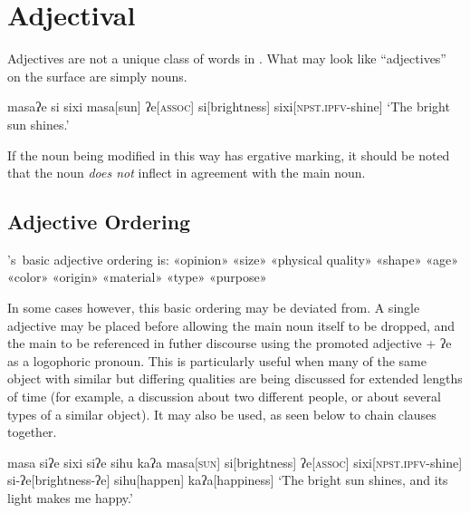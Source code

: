 \chapter{Adjectival}\label{ch:adjectives}
Adjectives are not a unique class of words in \langname . What may look like ``adjectives'' on the surface are simply nouns.

\ex
\begingl
\glpreamble masaʔe si sixi
\endpreamble
\nogloss{\lbrack}
masa[sun]
ʔe[\textsc{assoc}]
si[brightness]
\nogloss{\rbrack}
sixi[\textsc{npst.ipfv}-shine]
\glft `The bright sun shines.'
\endgl
\xe

If the noun being modified in this way has ergative marking, it should be noted that the noun \textit{does not} inflect in agreement with the main noun.

\section{Adjective Ordering}

\langname 's\ basic adjective ordering is: «opinion» «size» «physical quality» «shape» «age» «color» «origin» «material» «type» «purpose»

In some cases however, this basic ordering may be deviated from. A single adjective may be placed before  allowing the main noun itself to be dropped, and the main to be referenced in futher discourse using the promoted adjective + ʔe as a logophoric pronoun. This is particularly useful when many of the same object with similar but differing qualities are being discussed for extended lengths of time (for example, a discussion about two different people, or about several types of a similar object). It may also be used, as seen below to chain clauses together.

\ex
\begingl
\glpreamble masa siʔe sixi siʔe sihu kaʔa
\endpreamble
\nogloss{\lbrack}
masa[\textsc{sun}]
si[brightness]
ʔe[\textsc{assoc}]
\nogloss{\rbrack}
sixi[\textsc{npst.ipfv}-shine]
si-ʔe[brightness-ʔe]
sihu[happen]
kaʔa[happiness]
\glft `The bright sun shines, and its light makes me happy.'
\endgl
\xe

